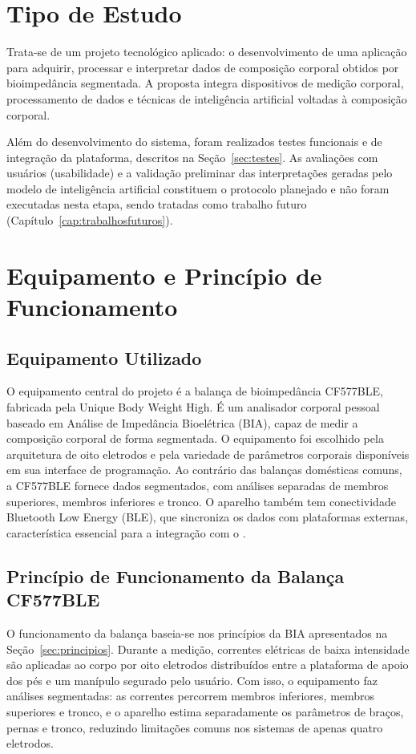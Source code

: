 \section{Tipo de Estudo}

Trata-se de um projeto tecnológico aplicado: o desenvolvimento de uma aplicação para
adquirir, processar e interpretar dados de composição corporal obtidos por bioimpedância
segmentada. A proposta integra dispositivos de medição corporal, processamento de dados e
técnicas de inteligência artificial voltadas à composição corporal.

Além do desenvolvimento do sistema, foram realizados testes funcionais e de integração da
plataforma, descritos na Seção~\ref{sec:testes}. As avaliações com usuários (usabilidade)
e a validação preliminar das interpretações geradas pelo modelo de inteligência artificial
constituem o protocolo planejado e não foram executadas nesta etapa, sendo tratadas como
trabalho futuro (Capítulo~\ref{cap:trabalhosfuturos}).

\section{Equipamento e Princípio de Funcionamento}

\subsection{Equipamento Utilizado}

O equipamento central do projeto é a balança de bioimpedância CF577BLE, fabricada pela
Unique Body Weight High. É um analisador corporal pessoal baseado em Análise de Impedância
Bioelétrica (BIA), capaz de medir a composição corporal de forma segmentada. O equipamento
foi escolhido pela arquitetura de oito eletrodos e pela variedade de parâmetros corporais
disponíveis em sua interface de programação. Ao contrário das balanças domésticas comuns,
a CF577BLE fornece dados segmentados, com análises separadas de membros superiores,
membros inferiores e tronco. O aparelho também tem conectividade Bluetooth Low Energy
(BLE), que sincroniza os dados com plataformas externas, característica essencial para a
integração com o \sintonia.

\subsection{Princípio de Funcionamento da Balança CF577BLE}

O funcionamento da balança baseia-se nos princípios da BIA apresentados na
Seção~\ref{sec:principios}. Durante a medição, correntes elétricas de baixa intensidade
são aplicadas ao corpo por oito eletrodos distribuídos entre a plataforma de apoio dos pés
e um manípulo segurado pelo usuário. Com isso, o equipamento faz análises segmentadas: as
correntes percorrem membros inferiores, membros superiores e tronco, e o aparelho estima
separadamente os parâmetros de braços, pernas e tronco, reduzindo limitações comuns nos
sistemas de apenas quatro eletrodos.

